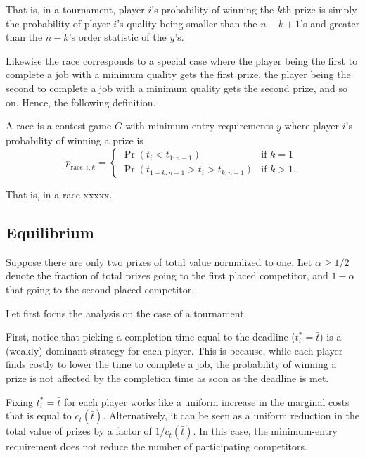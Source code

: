 \documentclass[12pt,]{article}
\newcommand\deadline{\bar{t}}
\newcommand\target{\underline{y}}
\newcommand\race{\text{race}}
\newcommand\ctime{c_{t}}
\begin{document}
That is, in a tournament, player \(i\)'s probability of winning the
\(k\)th prize is simply the probability of player \(i\)'s quality being
smaller than the \(n-k+1\)'s and greater than the \(n-k\)'s order
statistic of the \(y\)'s.

Likewise the race corresponds to a special case where the player being
the first to complete a job with a minimum quality gets the first prize,
the player being the second to complete a job with a minimum quality
gets the second prize, and so on. Hence, the following definition.

\begin{definition}
A race is a contest game $G$ with minimum-entry requirements $\target$ where player $i$'s probability of winning a prize is
\begin{equation}
  p_{\race, i, k} =
  \begin{cases}
    \Pr(t_i < t_{1:n-1}) & \text{if }k=1\\
    \Pr(t_{1-k:n-1} > t_i > t_{k:n-1}) & \text{if }k>1.
  \end{cases}
\end{equation}
\end{definition}

That is, in a race xxxxx.

\subsection{Equilibrium}\label{equilibrium}

Suppose there are only two prizes of total value normalized to one. Let
\(\alpha\geq 1/2\) denote the fraction of total prizes going to the
first placed competitor, and \(1-\alpha\) that going to the second
placed competitor.

Let first focus the analysis on the case of a tournament.

First, notice that picking a completion time equal to the deadline
(\(t_i^*=\deadline\)) is a (weakly) dominant strategy for each player.
This is because, while each player finds costly to lower the time to
complete a job, the probability of winning a prize is not affected by
the completion time as soon as the deadline is met.

Fixing \(t_i^*=\deadline\) for each player works like a uniform increase
in the marginal costs that is equal to \(\ctime(\deadline)\).
Alternatively, it can be seen as a uniform reduction in the total value
of prizes by a factor of \(1/\ctime(\deadline)\). In this case, the
minimum-entry requirement does not reduce the number of participating
competitors.
\end{document}
